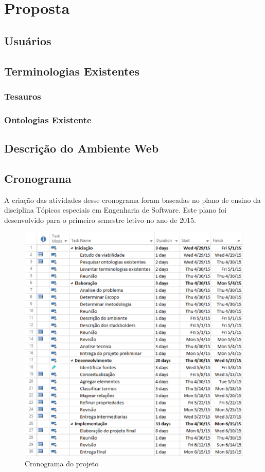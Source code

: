 \chapter{Proposta}\label{cap4}

\section{Usuários}


\section{Terminologias Existentes}

\subsection{Tesauros}

\subsection{Ontologias Existente}


\section{Descrição do Ambiente Web}


\section{Cronograma}
A criação das atividades desse cronograma foram baseadas no plano de ensino da disciplina Tópicos especiais em Engenharia de Software. Este plano foi desenvolvido para o primeiro semestre letivo no ano de 2015.

 \begin{figure}[ht]
  \centering
    \includegraphics[keepaspectratio=true,scale=0.5]{figuras/cronograma.eps}
  \caption{Cronograma do projeto}
\end{figure}